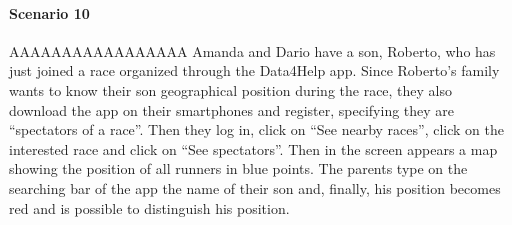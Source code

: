 \paragraph{Scenario 10} AAAAAAAAAAAAAAAAA\newline
Amanda and Dario have a son, Roberto, who has just joined a race organized through the Data4Help app. Since Roberto’s family wants to know their son geographical position during the race, they also download the app on their smartphones and register, specifying they are “spectators of a race”. Then they log in, click on “See nearby races”, click on the interested race and click on “See spectators”. Then in the screen appears a map showing the position of all runners in blue points. The parents type on the searching bar of the app the name of their son and, finally, his position becomes red and is possible to distinguish his position.
